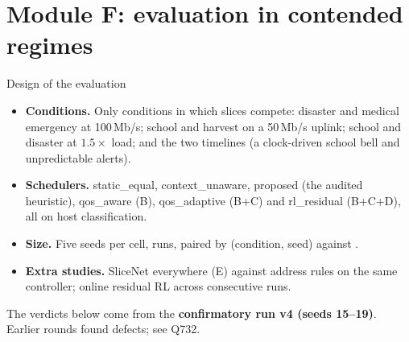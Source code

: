 \section{Module F: evaluation in contended regimes}\label{sec:qoseval}

\begin{keybox}{Design of the evaluation}
\begin{itemize}
\item \textbf{Conditions.} Only conditions in which slices compete: disaster and medical emergency at 100\,Mb/s; school
and harvest on a 50\,Mb/s uplink; school and disaster at $1.5\times$ load; and the two timelines (a clock-driven school
bell and unpredictable alerts).
\item \textbf{Schedulers.} static\_equal, context\_unaware, proposed (the audited heuristic), qos\_aware (B),
qos\_adaptive (B+C) and rl\_residual (B+C+D), all on host classification.
\item \textbf{Size.} Five seeds per cell, \NQRuns{} runs, paired by (condition, seed) against .
\item \textbf{Extra studies.} SliceNet everywhere (E) against address rules on the same controller; online residual RL
across consecutive runs.
\end{itemize}
The verdicts below come from the \textbf{confirmatory run v4 (seeds 15--19)}. Earlier rounds found defects; see Q732.
\end{keybox}

